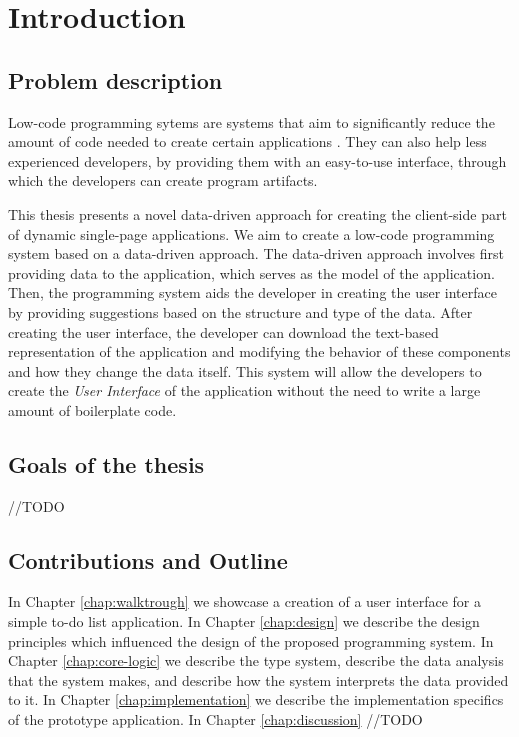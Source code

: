 \chapter*{Introduction}

\section*{Problem description}
Low-code programming sytems are systems that aim to significantly reduce the amount of code needed to create certain applications \cite{Pinho_Aguiar_Amaral_2023}.
They can also help less experienced developers, by providing them with an easy-to-use interface, through which the developers can create program artifacts.

This thesis presents a novel data-driven approach for creating the client-side part of dynamic single-page applications.
We aim to create a low-code programming system based on a data-driven approach.
The data-driven approach involves first providing data to the application, which serves as the model of the application.
Then, the programming system aids the developer in creating the user interface by providing suggestions based on the structure and type of the data.
After creating the user interface, the developer can download the text-based representation of the application and modifying the behavior of these components and how they change the data itself.
This system will allow the developers to create the \emph{User Interface} of the application without the need to write a large amount of boilerplate code.

\section*{Goals of the thesis}
//TODO

\section* {Contributions and Outline}

In Chapter \ref{chap:walktrough} we showcase a creation of a user interface for a simple to-do list application.
In Chapter \ref{chap:design} we describe the design principles which influenced the design of the proposed programming system.
In Chapter \ref{chap:core-logic} we describe the type system, describe the data analysis that the system makes, and describe how the system interprets the data provided to it.
In Chapter \ref{chap:implementation} we describe the implementation specifics of the prototype application.
In Chapter \ref{chap:discussion} //TODO
